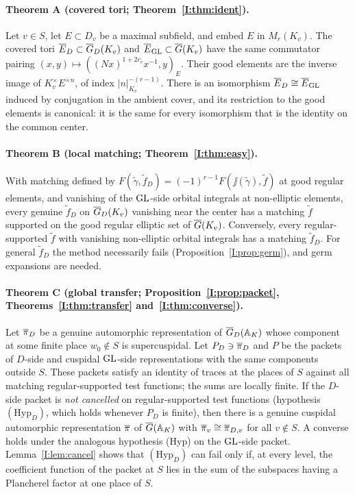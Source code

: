 \paragraph{Theorem A (covered tori; Theorem~\ref{I:thm:ident}).} Let $v\in S$, let $E\subset D_v$ be a maximal subfield, and embed $E$ in $M_r(K_v)$. The covered tori $\overline{E}_D\subset\overline{G}_D(K_v)$ and $\overline{E}_{\mathrm{GL}}\subset\overline{G}(K_v)$ have the same commutator pairing $(x,y)\mapsto((Nx)^{1+2c_v}x^{-1},y)_E$. Their good elements are the inverse image of $K_v^\times E^{\times n}$, of index $|n|_{K_v}^{-(r-1)}$. There is an isomorphism $\overline{E}_D\cong\overline{E}_{\mathrm{GL}}$ induced by conjugation in the ambient cover, and its restriction to the good elements is canonical: it is the same for every isomorphism that is the identity on the common center.

\paragraph{Theorem B (local matching; Theorem~\ref{I:thm:easy}).} With matching defined by $F(\tilde\gamma,\tilde f_D)=(-1)^{r-1}F(\jj(\tilde\gamma),\tilde f)$ at good regular elements, and vanishing of the $\mathrm{GL}$-side orbital integrals at non-elliptic elements, every genuine $\tilde f_D$ on $\overline{G}_D(K_v)$ vanishing near the center has a matching $\tilde f$ supported on the good regular elliptic set of $\overline{G}(K_v)$. Conversely, every regular-supported $\tilde f$ with vanishing non-elliptic orbital integrals has a matching $\tilde f_D$. For general $\tilde f_D$ the method necessarily fails (Proposition~\ref{I:prop:germ}), and germ expansions are needed.

\paragraph{Theorem C (global transfer; Proposition~\ref{I:prop:packet}, Theorems~\ref{I:thm:transfer} and~\ref{I:thm:converse}).} Let $\overline{\pi}_D$ be a genuine automorphic representation of $\overline{G}_D(\mathbb{A}_K)$ whose component at some finite place $w_0\notin S$ is supercuspidal. Let $P_D\ni\overline{\pi}_D$ and $P$ be the packets of $D$-side and cuspidal $\mathrm{GL}$-side representations with the same components outside $S$. These packets satisfy an identity of traces at the places of $S$ against all matching regular-supported test functions; the sums are locally finite. If the $D$-side packet is \emph{not cancelled} on regular-supported test functions (hypothesis $(\mathrm{Hyp}_D)$, which holds whenever $P_D$ is finite), then there is a genuine cuspidal automorphic representation $\overline{\pi}$ of $\overline{G}(\mathbb{A}_K)$ with $\overline{\pi}_v\cong\overline{\pi}_{D,v}$ for all $v\notin S$. A converse holds under the analogous hypothesis (Hyp) on the $\mathrm{GL}$-side packet. Lemma~\ref{I:lem:cancel} shows that $(\mathrm{Hyp}_D)$ can fail only if, at every level, the coefficient function of the packet at $S$ lies in the sum of the subspaces having a Plancherel factor at one place of $S$.

